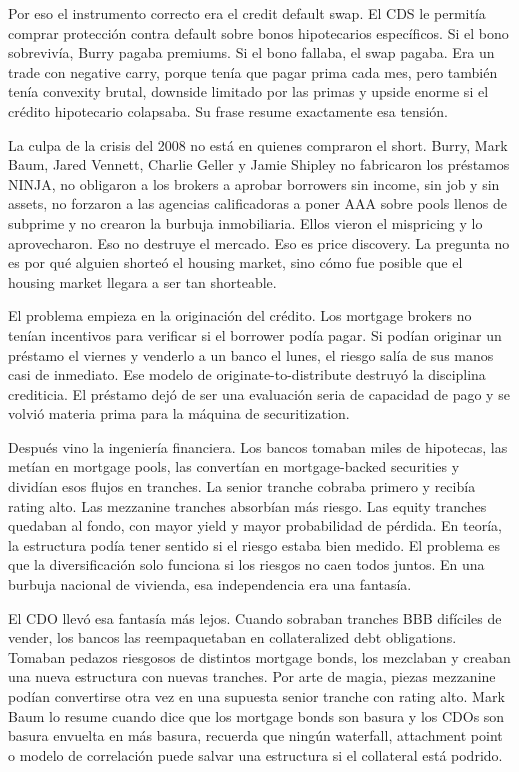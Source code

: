 Por eso el instrumento correcto era el credit default swap. El CDS le permitía comprar protección contra default sobre bonos hipotecarios específicos. Si el bono sobrevivía, Burry pagaba premiums. Si el bono fallaba, el swap pagaba. Era un trade con negative carry, porque tenía que pagar prima cada mes, pero también tenía convexity brutal, downside limitado por las primas y upside enorme si el crédito hipotecario colapsaba. Su frase  resume exactamente esa tensión. 

La culpa de la crisis del 2008 no está en quienes compraron el short. Burry, Mark Baum, Jared Vennett, Charlie Geller y Jamie Shipley no fabricaron los préstamos NINJA, no obligaron a los brokers a aprobar borrowers sin income, sin job y sin assets, no forzaron a las agencias calificadoras a poner AAA sobre pools llenos de subprime y no crearon la burbuja inmobiliaria. Ellos vieron el mispricing y lo aprovecharon. Eso no destruye el mercado. Eso es price discovery. La pregunta no es por qué alguien shorteó el housing market, sino cómo fue posible que el housing market llegara a ser tan shorteable.

El problema empieza en la originación del crédito. Los mortgage brokers no tenían incentivos para verificar si el borrower podía pagar. Si podían originar un préstamo el viernes y venderlo a un banco el lunes, el riesgo salía de sus manos casi de inmediato. Ese modelo de originate-to-distribute destruyó la disciplina crediticia. El préstamo dejó de ser una evaluación seria de capacidad de pago y se volvió materia prima para la máquina de securitization.

Después vino la ingeniería financiera. Los bancos tomaban miles de hipotecas, las metían en mortgage pools, las convertían en mortgage-backed securities y dividían esos flujos en tranches. La senior tranche cobraba primero y recibía rating alto. Las mezzanine tranches absorbían más riesgo. Las equity tranches quedaban al fondo, con mayor yield y mayor probabilidad de pérdida. En teoría, la estructura podía tener sentido si el riesgo estaba bien medido. El problema es que la diversificación solo funciona si los riesgos no caen todos juntos. En una burbuja nacional de vivienda, esa independencia era una fantasía.

El CDO llevó esa fantasía más lejos. Cuando sobraban tranches BBB difíciles de vender, los bancos las reempaquetaban en collateralized debt obligations. Tomaban pedazos riesgosos de distintos mortgage bonds, los mezclaban y creaban una nueva estructura con nuevas tranches. Por arte de magia, piezas mezzanine podían convertirse otra vez en una supuesta senior tranche con rating alto. Mark Baum lo resume cuando dice que los mortgage bonds son basura y los CDOs son basura envuelta en más basura, recuerda que ningún waterfall, attachment point o modelo de correlación puede salvar una estructura si el collateral está podrido.

